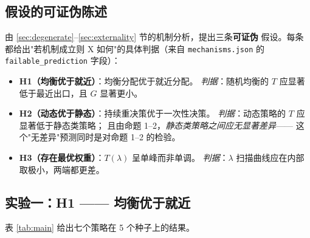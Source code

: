 \subsection{假设的可证伪陈述}
\label{sec:hypotheses}

由 \ref{sec:degenerate}--\ref{sec:externality} 节的机制分析，提出三条\textbf{可证伪}
假设。每条都给出"若机制成立则 X 如何"的具体判据（来自
\texttt{mechanisms.json} 的 \texttt{failable\_prediction} 字段）：

\begin{itemize}
  \item \textbf{H1（均衡优于就近）}：均衡分配优于就近分配。
        \emph{判据}：随机均衡的 $T$ 应显著低于最近出口，且 $G$ 显著更小。
  \item \textbf{H2（动态优于静态）}：持续重决策优于一次性决策。
        \emph{判据}：动态策略的 $T$ 应显著低于静态类策略；
        且由命题 1--2，\emph{静态类策略之间应无显著差异}——
        这个"无差异"预测同时是对命题 1--2 的检验。
  \item \textbf{H3（存在最优权重）}：$T(\lambda)$ 呈单峰而非单调。
        \emph{判据}：$\lambda$ 扫描曲线应在内部取极小，两端都更差。
\end{itemize}

\subsection{实验一：H1 —— 均衡优于就近}
\label{sec:exp1}

表 \ref{tab:main} 给出七个策略在 5 个种子上的结果。

